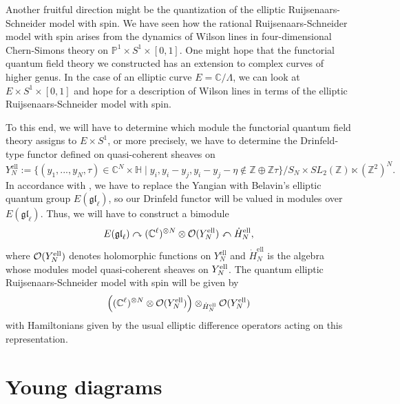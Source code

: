 \documentclass[11pt]{report}
\theoremstyle{definition}
\theoremstyle{remark}
\theoremstyle{remark}
\newcommand{\Z}{\mathbb{Z}}
\newcommand{\C}{\mathbb{C}}
\renewcommand{\P}{\mathbb{P}}
\begin{document}
Another fruitful direction might be the quantization of the elliptic Ruijsenaars-Schneider model with spin. We have seen how the rational Ruijsenaars-Schneider model with spin arises from the dynamics of Wilson lines in four-dimensional Chern-Simons theory on $\P^1 \times S^1 \times [0,1]$. One might hope that the functorial quantum field theory we constructed has an extension to complex curves of higher genus. In the case of an elliptic curve $E = \C/\Lambda$, we can look at $E \times S^1 \times [0,1]$ and hope for a description of Wilson lines in terms of the elliptic Ruijsenaars-Schneider model with spin.

To this end, we will have to determine which module the functorial quantum field theory assigns to $E \times S^1$, or more precisely, we have to determine the Drinfeld-type functor defined on quasi-coherent sheaves on
\begin{equation*}
Y_N^\text{ell} := \{ (y_1,...,y_N,\tau) \in \C^N \times \mathbb{H} \mid y_i,y_i-y_j,y_i-y_j-\eta \notin \Z \oplus \Z \tau \}/S_N \times SL_2(\Z) \ltimes (\Z^2)^N.
\end{equation*}
In accordance with \cite{article:costello:2018b}, we have to replace the Yangian with Belavin's elliptic quantum group $E(\mathfrak{gl}_\ell)$, so our Drinfeld functor will be valued in modules over $E(\mathfrak{gl}_\ell)$. Thus, we will have to construct a bimodule
\begin{equation*}
E(\mathfrak{gl}_\ell) \curvearrowright (\C^\ell)^{\otimes N} \otimes \mathcal{O}(Y_N^\textnormal{ell}) \curvearrowleft \dot H_N^\text{ell},
\end{equation*}
where $\mathcal{O}(Y_N^\textnormal{ell})$ denotes holomorphic functions on $Y_N^\text{ell}$ and $\dot H_N^\text{ell}$ is the algebra whose modules model quasi-coherent sheaves on $Y_N^\textnormal{ell}$. The quantum elliptic Ruijsenaars-Schneider model with spin will be given by
\begin{equation*}
\Big( (\C^\ell)^{\otimes N} \otimes \mathcal{O}(Y_N^\textnormal{ell}) \Big) \otimes_{\dot H_N^\text{ell}} \mathcal{O}(Y_N^\textnormal{ell})
\end{equation*}
with Hamiltonians given by the usual elliptic difference operators acting on this representation.



\appendix \label{appendix}

\chapter{Young diagrams} \label{appendix:youngdiagrams}
\end{document}

